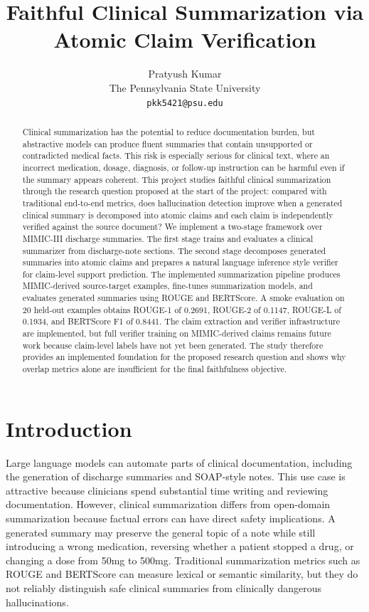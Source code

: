 \documentclass[11pt]{article}
\title{Faithful Clinical Summarization via Atomic Claim Verification}
\author{Pratyush Kumar \\
  The Pennsylvania State University \\
  {\tt pkk5421@psu.edu}}
\begin{document}
\maketitle

\begin{abstract}
Clinical summarization has the potential to reduce documentation burden, but abstractive models can produce fluent summaries that contain unsupported or contradicted medical facts. This risk is especially serious for clinical text, where an incorrect medication, dosage, diagnosis, or follow-up instruction can be harmful even if the summary appears coherent. This project studies faithful clinical summarization through the research question proposed at the start of the project: compared with traditional end-to-end metrics, does hallucination detection improve when a generated clinical summary is decomposed into atomic claims and each claim is independently verified against the source document? We implement a two-stage framework over MIMIC-III discharge summaries. The first stage trains and evaluates a clinical summarizer from discharge-note sections. The second stage decomposes generated summaries into atomic claims and prepares a natural language inference style verifier for claim-level support prediction. The implemented summarization pipeline produces MIMIC-derived source-target examples, fine-tunes summarization models, and evaluates generated summaries using ROUGE and BERTScore. A smoke evaluation on 20 held-out examples obtains ROUGE-1 of 0.2691, ROUGE-2 of 0.1147, ROUGE-L of 0.1934, and BERTScore F1 of 0.8441. The claim extraction and verifier infrastructure are implemented, but full verifier training on MIMIC-derived claims remains future work because claim-level labels have not yet been generated. The study therefore provides an implemented foundation for the proposed research question and shows why overlap metrics alone are insufficient for the final faithfulness objective.
\end{abstract}

\section{Introduction}

Large language models can automate parts of clinical documentation, including the generation of discharge summaries and SOAP-style notes. This use case is attractive because clinicians spend substantial time writing and reviewing documentation. However, clinical summarization differs from open-domain summarization because factual errors can have direct safety implications. A generated summary may preserve the general topic of a note while still introducing a wrong medication, reversing whether a patient stopped a drug, or changing a dose from 50mg to 500mg. Traditional summarization metrics such as ROUGE \cite{lin2004rouge} and BERTScore \cite{zhang2020bertscore} can measure lexical or semantic similarity, but they do not reliably distinguish safe clinical summaries from clinically dangerous hallucinations.
\end{document}
